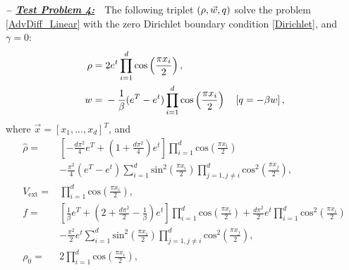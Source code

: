 \textbf{\emph{-- \underline{Test Problem 4:}}}~~The following triplet $(\rho,\vec{w},q)$ solve the problem \eqref{AdvDiff_Linear} with the zero Dirichlet boundary condition \eqref{Dirichlet}, and $\gamma =0$:
\begin{align*}
\ \rho={}&2e^{t}\prod_{i=1}^{d}\text{cos}\left(\frac{\pi{}x_i}{2}\right), \\
\ w={}&-\frac{1}{\beta}(e^{T}-e^{t})\prod_{i=1}^{d}\text{cos}\left(\frac{\pi{}x_i}{2}\right)\quad\left[\adj=-\beta{}w\right],
\end{align*}
where $\vec{x}=[x_1,...,x_d]^T$, and
\begin{align*}
\ \widehat{\rho}={}&\left[-\frac{d\pi^2}{4}e^{T}+\left(1+\frac{d\pi^2}{4}\right)e^{t}\right]\prod_{i=1}^{d}\text{cos}\left(\frac{\pi{}x_i}{2}\right) \\
\ &-\frac{\pi^2}{4}(e^{T}-e^{t})\sum_{i=1}^{d}\text{sin}^2\left(\frac{\pi{}x_i}{2}\right)\prod_{j=1,j\neq{}i}^{d}\text{cos}^2\left(\frac{\pi{}x_j}{2}\right), \\
\ V_{\text{ext}}={}&\prod_{i=1}^{d}\text{cos}\left(\frac{\pi{}x_i}{2}\right), \\
\ f={}&\left[\frac{1}{\beta}e^{T}+\left(2+\frac{d\pi^2}{2}-\frac{1}{\beta}\right)e^{t}\right]\prod_{i=1}^{d}\text{cos}\left(\frac{\pi{}x_i}{2}\right)+\frac{d\pi^{2}}{2}e^{t}\prod_{i=1}^{d}\text{cos}^2\left(\frac{\pi{}x_i}{2}\right) \\
\ &-\frac{\pi^2}{2}e^{t}\sum_{i=1}^{d}\text{sin}^2\left(\frac{\pi{}x_i}{2}\right)\prod_{j=1,j\neq{}i}^{d}\text{cos}^2\left(\frac{\pi{}x_j}{2}\right), \\
\ \rho_{0}={}&2\prod_{i=1}^{d}\text{cos}\left(\frac{\pi{}x_i}{2}\right),
\end{align*}

